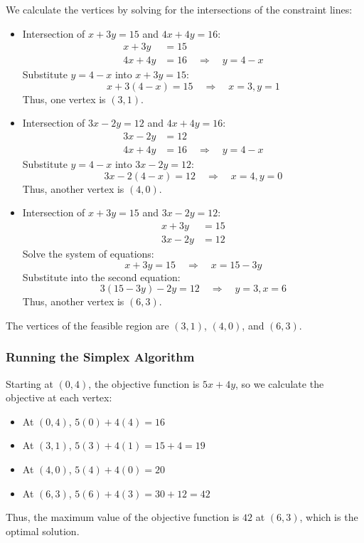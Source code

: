 \documentclass[11pt]{article}
\begin{document}
We calculate the vertices by solving for the intersections of the constraint lines:
\begin{itemize}
    \item Intersection of \( x + 3y = 15 \) and \( 4x + 4y = 16 \):
    \[
    \begin{aligned}
        x + 3y &= 15 \\
        4x + 4y &= 16 \quad \Rightarrow \quad y = 4 - x
    \end{aligned}
    \]
    Substitute \( y = 4 - x \) into \( x + 3y = 15 \):
    \[
    x + 3(4 - x) = 15 \quad \Rightarrow \quad x = 3, y = 1
    \]
    Thus, one vertex is \( (3, 1) \).
    
    \item Intersection of \( 3x - 2y = 12 \) and \( 4x + 4y = 16 \):
    \[
    \begin{aligned}
        3x - 2y &= 12 \\
        4x + 4y &= 16 \quad \Rightarrow \quad y = 4 - x
    \end{aligned}
    \]
    Substitute \( y = 4 - x \) into \( 3x - 2y = 12 \):
    \[
    3x - 2(4 - x) = 12 \quad \Rightarrow \quad x = 4, y = 0
    \]
    Thus, another vertex is \( (4, 0) \).

    \item Intersection of \( x + 3y = 15 \) and \( 3x - 2y = 12 \):
    \[
    \begin{aligned}
        x + 3y &= 15 \\
        3x - 2y &= 12
    \end{aligned}
    \]
    Solve the system of equations:
    \[
    x + 3y = 15 \quad \Rightarrow \quad x = 15 - 3y
    \]
    Substitute into the second equation:
    \[
    3(15 - 3y) - 2y = 12 \quad \Rightarrow \quad y = 3, x = 6
    \]
    Thus, another vertex is \( (6, 3) \).
\end{itemize}

The vertices of the feasible region are \( (3, 1) \), \( (4, 0) \), and \( (6, 3) \).

\subsubsection*{Running the Simplex Algorithm}

Starting at \( (0, 4) \), the objective function is \( 5x + 4y \), so we calculate the objective at each vertex:

\begin{itemize}
    \item At \( (0, 4) \), \( 5(0) + 4(4) = 16 \)
    \item At \( (3, 1) \), \( 5(3) + 4(1) = 15 + 4 = 19 \)
    \item At \( (4, 0) \), \( 5(4) + 4(0) = 20 \)
    \item At \( (6, 3) \), \( 5(6) + 4(3) = 30 + 12 = 42 \)
\end{itemize}

Thus, the maximum value of the objective function is \( 42 \) at \( (6, 3) \), which is the optimal solution.
\end{document}
